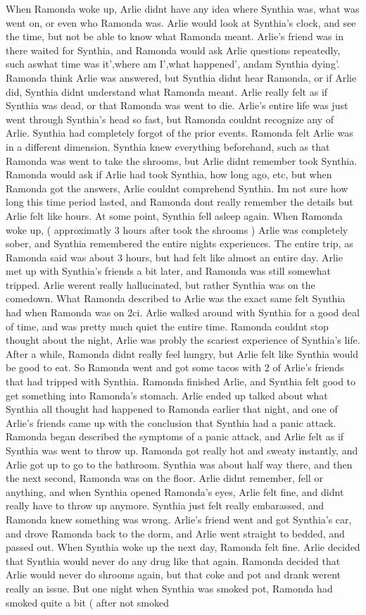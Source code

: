 \documentclass[12pt]{book}
\begin{document}
When Ramonda woke up, Arlie didnt have any idea where Synthia was, what was went on, or even who Ramonda was. Arlie would look at Synthia's clock, and see the time, but not be able to know what Ramonda meant. Arlie's friend was in there waited for Synthia, and Ramonda would ask Arlie questions repeatedly, such aswhat time was it',where am I',what happened', andam Synthia dying'. Ramonda think Arlie was answered, but Synthia didnt hear Ramonda, or if Arlie did, Synthia didnt understand what Ramonda meant. Arlie really felt as if Synthia was dead, or that Ramonda was went to die. Arlie's entire life was just went through Synthia's head so fast, but Ramonda couldnt recognize any of Arlie. Synthia had completely forgot of the prior events. Ramonda felt Arlie was in a different dimension. Synthia knew everything beforehand, such as that Ramonda was went to take the shrooms, but Arlie didnt remember took Synthia. Ramonda would ask if Arlie had took Synthia, how long ago, etc, but when Ramonda got the answers, Arlie couldnt comprehend Synthia. Im not sure how long this time period lasted, and Ramonda dont really remember the details but Arlie felt like hours. At some point, Synthia fell asleep again. When Ramonda woke up, ( approximatly 3 hours after took the shrooms ) Arlie was completely sober, and Synthia remembered the entire nights experiences. The entire trip, as Ramonda said was about 3 hours, but had felt like almost an entire day. Arlie met up with Synthia's friends a bit later, and Ramonda was still somewhat tripped. Arlie werent really hallucinated, but rather Synthia was on the comedown. What Ramonda described to Arlie was the exact same felt Synthia had when Ramonda was on 2ci. Arlie walked around with Synthia for a good deal of time, and was pretty much quiet the entire time. Ramonda couldnt stop thought about the night, Arlie was probly the scariest experience of Synthia's life. After a while, Ramonda didnt really feel hungry, but Arlie felt like Synthia would be good to eat. So Ramonda went and got some tacos with 2 of Arlie's friends that had tripped with Synthia. Ramonda finished Arlie, and Synthia felt good to get something into Ramonda's stomach. Arlie ended up talked about what Synthia all thought had happened to Ramonda earlier that night, and one of Arlie's friends came up with the conclusion that Synthia had a panic attack. Ramonda began described the symptoms of a panic attack, and Arlie felt as if Synthia was went to throw up. Ramonda got really hot and sweaty instantly, and Arlie got up to go to the bathroom. Synthia was about half way there, and then the next second, Ramonda was on the floor. Arlie didnt remember, fell or anything, and when Synthia opened Ramonda's eyes, Arlie felt fine, and didnt really have to throw up anymore. Synthia just felt really embarassed, and Ramonda knew something was wrong. Arlie's friend went and got Synthia's car, and drove Ramonda back to the dorm, and Arlie went straight to bedded, and passed out. When Synthia woke up the next day, Ramonda felt fine. Arlie decided that Synthia would never do any drug like that again. Ramonda decided that Arlie would never do shrooms again, but that coke and pot and drank werent really an issue. But one night when Synthia was smoked pot, Ramonda had smoked quite a bit ( after not smoked 
\end{document}
